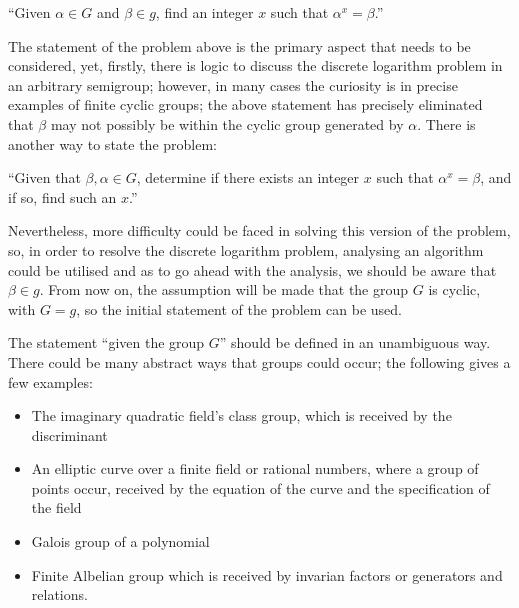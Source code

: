 \documentclass[iwp,first]{luthesis}
\begin{document}
\begin{center}

``Given $\alpha \in G$ and $\beta \in g$, find an integer $x$ such that $\alpha^x =\beta$.”

\end{center}

The statement of the problem above is the primary aspect that needs to be considered, yet, firstly, there is logic to discuss the discrete logarithm problem in an arbitrary semigroup; however, in many cases the curiosity is in precise examples of finite cyclic groups; the above statement has precisely eliminated that $\beta$ may not possibly be within the cyclic group generated by $\alpha$. There is another way to state the problem:

\begin{center}

``Given that $\beta, \alpha \in G$, determine if there exists an integer $x$ such that $\alpha^x=\beta$, and if so, find such an $x$.”

\end{center}

Nevertheless, more difficulty could be faced in solving this version of the problem, so, in order to resolve the discrete logarithm problem, analysing an algorithm could be utilised and as to go ahead with the analysis, we should be aware that $\beta \in g$. From now on, the assumption will be made that the group $G$ is cyclic, with $G = g$, so the initial statement of the problem can be used. 

The statement ``given the group $G$” should be defined in an unambiguous way. There could be many abstract ways that groups could occur; the following gives a few examples: 

\begin{itemize}

\item The imaginary quadratic field’s class group, which is received by the discriminant
\item An elliptic curve over a finite field or rational numbers, where a group of points occur, received by the equation of the curve and the specification of the field
\item Galois group of a polynomial
\item Finite Albelian group which is received by invarian factors or generators and relations. 

\end{itemize}
\end{document}
